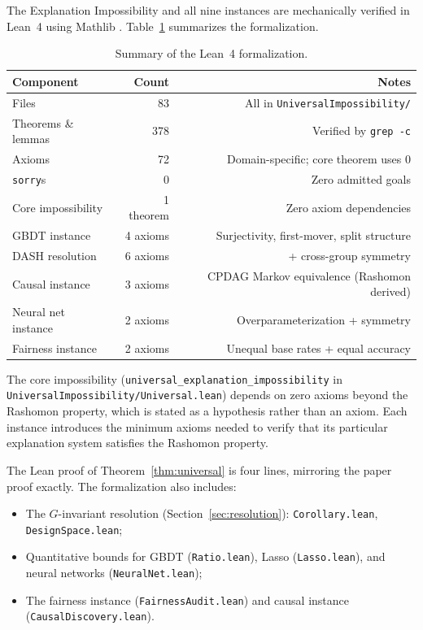 \documentclass{article}
\begin{document}
The Explanation Impossibility and all nine instances are mechanically
verified in Lean~4 \citep{demoura2021lean4} using Mathlib
\citep{mathlib2020}.  Table~\ref{tab:lean-summary} summarizes the
formalization.

\begin{table}[h]
\centering
\caption{Summary of the Lean~4 formalization.}
\label{tab:lean-summary}
\begin{tabular}{lrr}
\toprule
Component & Count & Notes \\
\midrule
Files & 83 & All in \texttt{UniversalImpossibility/} \\
Theorems \& lemmas & 378 & Verified by \texttt{grep -c} \\
Axioms & 72 & Domain-specific; core theorem uses 0 \\
\texttt{sorry}s & 0 & Zero admitted goals \\
\midrule
Core impossibility & 1 theorem & Zero axiom dependencies \\
GBDT instance & 4 axioms & Surjectivity, first-mover, split structure \\
DASH resolution & 6 axioms & + cross-group symmetry \\
Causal instance & 3 axioms & CPDAG Markov equivalence (Rashomon derived) \\
Neural net instance & 2 axioms & Overparameterization + symmetry \\
Fairness instance & 2 axioms & Unequal base rates + equal accuracy \\
\bottomrule
\end{tabular}
\end{table}

The core impossibility (\texttt{universal\_explanation\_impossibility} in
\texttt{UniversalImpossibility/Universal.lean}) depends on zero axioms beyond
the Rashomon property, which is stated as a hypothesis rather than an axiom.
Each instance introduces the minimum axioms needed to verify that its
particular explanation system satisfies the Rashomon property.

The Lean proof of Theorem~\ref{thm:universal} is four lines, mirroring the
paper proof exactly.  The formalization also includes:
\begin{itemize}
  \item The $G$-invariant resolution (Section~\ref{sec:resolution}):
    \texttt{Corollary.lean}, \texttt{DesignSpace.lean};
  \item Quantitative bounds for GBDT (\texttt{Ratio.lean}), Lasso
    (\texttt{Lasso.lean}), and neural networks (\texttt{NeuralNet.lean});
  \item The fairness instance (\texttt{FairnessAudit.lean}) and causal
    instance (\texttt{CausalDiscovery.lean}).
\end{itemize}
\end{document}
